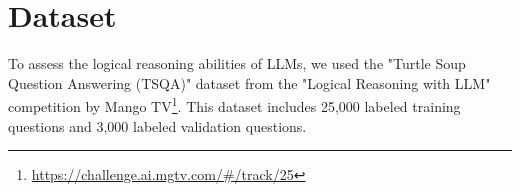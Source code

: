 \documentclass[conference]{IEEEtran}
\begin{document}
\section{Dataset}


To assess the logical reasoning abilities of LLMs, we used the "Turtle Soup Question Answering (TSQA)" dataset from the "Logical Reasoning with LLM" competition by Mango TV\footnote{\url{https://challenge.ai.mgtv.com/\#/track/25}}. This dataset includes 25,000 labeled training questions and 3,000 labeled validation questions.


\end{document}
